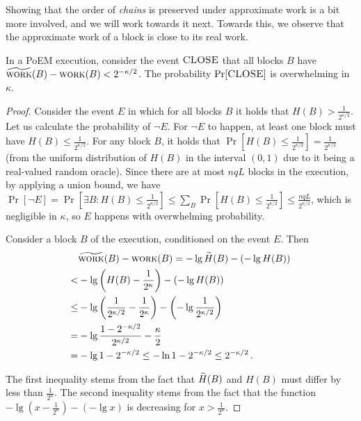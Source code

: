 Showing that the order of \emph{chains}
is preserved under approximate work is a bit more involved,
and we will work towards it next.
Towards this, we observe that the approximate work of a block is
close to its real work.

\begin{lemma}\label{lem:block-work-approximation}
  In a PoEM execution, consider the event $\textsc{CLOSE}$ that all blocks $B$
  have $\widetilde{\textsc{work}}(B) - \textsc{work}(B) < 2^{-\kappa/2}$.
  The probability $\Pr[\textsc{CLOSE}]$ is overwhelming in $\kappa$.
\end{lemma}
\begin{proof}
  Consider the event $E$ in which for all blocks $B$ it holds that
  $H(B) > \frac{1}{2^{\kappa/2}}$.
  Let us calculate the probability of $\lnot E$. For $\lnot E$ to happen,
  at least one block must have $H(B) \leq \frac{1}{2^{\kappa/2}}$.
  For any block $B$, it holds that $\Pr[H(B) \leq \frac{1}{2^{\kappa/2}}] = \frac{1}{2^{\kappa/2}}$ (from the
  uniform distribution of $H(B)$ in the interval $(0, 1)$ due to it being a real-valued random oracle).
  Since there are at most $nqL$ blocks in the execution, by applying a union bound, we have
  $\Pr[\lnot E] = \Pr[\exists B: H(B) \leq \frac{1}{2^{\kappa/2}}] \leq \sum_B \Pr[H(B) \leq \frac{1}{2^{\kappa/2}}] \leq \frac{nqL}{2^{\kappa/2}}$,
  which is negligible in $\kappa$,
  so $E$ happens with overwhelming probability.

  Consider a block $B$ of the execution, conditioned on the event $E$.
  Then
  \begin{align*}
        &\widetilde{\textsc{work}}(B) - \textsc{work}(B) = -\lg \widetilde{H}(B) - (-\lg H(B))\\
       <& -\lg\left(H(B) - \frac{1}{2^\kappa}\right) - (-\lg H(B))\\
    \leq& -\lg\left(\frac{1}{2^{\kappa/2}} - \frac{1}{2^\kappa}\right) - \left(-\lg{\frac{1}{2^{\kappa/2}}}\right)\\
       =& -\lg\frac{1 - 2^{-\kappa/2}}{2^{\kappa/2}} - \frac{\kappa}{2} \\
       =& -\lg{1 - 2^{-\kappa/2}} \leq -\ln{1 - 2^{-\kappa/2}} \leq 2^{-\kappa/2}\,.
  \end{align*}

  The first inequality stems from the fact that $\widetilde{H}(B)$ and $H(B)$ must
  differ by less than $\frac{1}{2^\kappa}$. The second inequality stems from
  the fact that the function $-\lg\left(x - \frac{1}{2^\kappa}\right) - (-\lg x)$ is
  decreasing for $x > \frac{1}{2^\kappa}$.
  \Qed
\end{proof}


